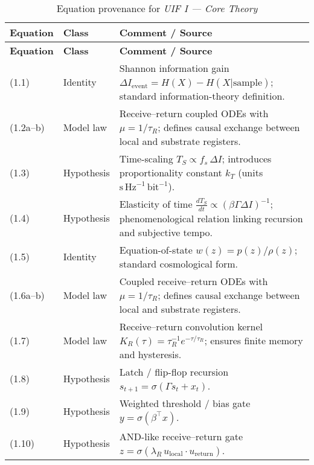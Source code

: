 \begin{longtable}{@{}p{2.2cm}p{2.7cm}p{9.5cm}@{}}
\caption{Equation provenance for \textit{UIF I — Core Theory}}
\label{tab:eq_provenance_UIF1}\\
\toprule
\textbf{Equation} & \textbf{Class} & \textbf{Comment / Source} \\
\midrule
\endfirsthead

\toprule
\textbf{Equation} & \textbf{Class} & \textbf{Comment / Source} \\
\midrule
\endhead

\bottomrule
\endfoot

(1.1) & Identity &
Shannon information gain $\Delta I_{\mathrm{event}} = H(X)-H(X|\mathrm{sample})$; standard information-theory definition. \\[4pt]

(1.2a–b) & Model law &
Receive–return coupled ODEs with $\mu = 1/\tau_R$; defines causal exchange between local and substrate registers. \\[4pt]

(1.3) & Hypothesis &
Time-scaling $T_S \propto f_s\,\Delta I$; introduces proportionality constant $k_T$ (units $\mathrm{s}\,\mathrm{Hz}^{-1}\,\mathrm{bit}^{-1}$). \\[4pt]

(1.4) & Hypothesis &
Elasticity of time $\tfrac{dT_S}{dt}\propto(\beta\Gamma\Delta I)^{-1}$; phenomenological relation linking recursion and subjective tempo. \\[4pt]

(1.5) & Identity &
Equation-of-state $w(z)=p(z)/\rho(z)$; standard cosmological form. \\[4pt]

(1.6a–b) & Model law &
Coupled receive–return ODEs with $\mu = 1/\tau_R$; defines causal exchange between local and substrate registers. \\[4pt]

(1.7) & Model law &
Receive–return convolution kernel $K_R(\tau)=\tau_R^{-1}e^{-\tau/\tau_R}$; ensures finite memory and hysteresis. \\[4pt]

(1.8) & Hypothesis &
Latch / flip-flop recursion $s_{t+1}=\sigma(\Gamma s_t + x_t)$. \\[4pt]

(1.9) & Hypothesis &
Weighted threshold / bias gate $y=\sigma(\beta^{\top} x)$. \\[4pt]

(1.10) & Hypothesis &
AND-like receive–return gate $z=\sigma(\lambda_R\,u_{\text{local}}\!\cdot\!u_{\text{return}})$. \\[4pt]


\end{longtable}
